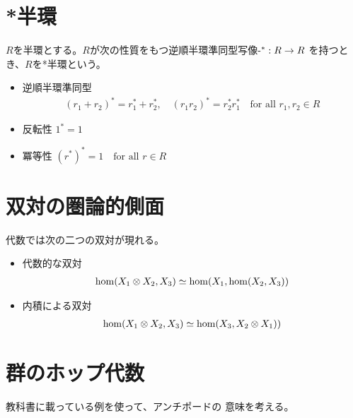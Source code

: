 \section{*半環}\label{s1:*半環} %
	\begin{definition}[*半環]\label{def:*半環} %
		$R$を半環とする。$R$が次の性質をもつ逆順半環準同型写像$\myhere^*:R\to R$
		を持つとき、$R$を*半環という。
		\begin{itemize}\setlength{\itemsep}{-1mm} %
			\item 逆順半環準同型
			\begin{equation*}\begin{split} %
				(r_1+r_2)^* = r_1^*+r_2^*,\quad (r_1r_2)^* = r_2^*r_1^*
				\quad\text{for all }r_1,r_2\in R
			\end{split}\end{equation*} %
			\item 反転性 $1^*=1$
			\item 冪等性 $(r^*)^*=1 \quad\text{for all }r\in R$
		\end{itemize} %
	\end{definition} %

\section{双対の圏論的側面}\label{s1:双対の圏論的側面} %
	代数では次の二つの双対が現れる。
	\begin{itemize}\setlength{\itemsep}{-1mm} %
		\item 代数的な双対
		\begin{equation*}\begin{split} %
			\homset(X_1\otimes X_2, X_3)\simeq\homset(X_1,\homset(X_2,X_3))
		\end{split}\end{equation*} %
		\item 内積による双対
		\begin{equation*}\begin{split} %
			\homset(X_1\otimes X_2, X_3)\simeq\homset(X_3,X_2\otimes X_1))
		\end{split}\end{equation*} %
	\end{itemize} %

\section{群のホップ代数}\label{s1:群のホップ代数} %
	教科書\cite{bk:jinbo.ryousigun}に載っている例を使って、アンチポードの
	意味を考える。

